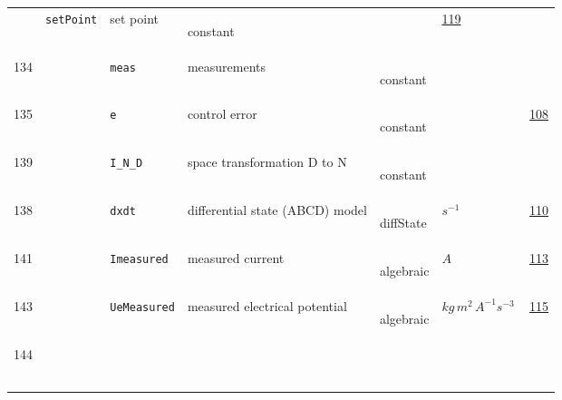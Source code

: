 \begin{longtable}{|p{1cm}|p{2.5cm}|p{4.5cm}|p{8cm}|p{3.0cm}|p{3cm}|p{1cm}|}
             & \verb|setPoint|
             & set point
             & \begin{lay}constant \end{lay}
             & $  $
             &                 \hyperlink{"e:119"}{ 119 }
                 \\
        134
             & \hypertarget{"v:134"}{ $ {} $}
             & \verb|meas|
             & measurements
             & \begin{lay}constant \end{lay}
             & $  $
             & \\
        135
             & \hypertarget{"v:135"}{ $ {} $}
             & \verb|e|
             & control error
             & \begin{lay}constant \end{lay}
             & $  $
             &                 \hyperlink{"e:108"}{ 108 }
                 \\
        139
             & \hypertarget{"v:139"}{ $ {} $}
             & \verb|I_N_D|
             & space transformation D to N
             & \begin{lay}constant \end{lay}
             & $  $
             & \\
        138
             & \hypertarget{"v:138"}{ $ {} $}
             & \verb|dxdt|
             & differential state (ABCD) model
             & \begin{lay}diffState \end{lay}
             & $ s^{-1} \, $
             &                 \hyperlink{"e:110"}{ 110 }
                 \\
        141
             & \hypertarget{"v:141"}{ $ {} $}
             & \verb|Imeasured|
             & measured current
             & \begin{lay}algebraic \end{lay}
             & $ A \, $
             &                 \hyperlink{"e:113"}{ 113 }
                 \\
        143
             & \hypertarget{"v:143"}{ $ {} $}
             & \verb|UeMeasured|
             & measured electrical potential
             & \begin{lay}algebraic \end{lay}
             & $ kg \,m^{2} \,A^{-1} s^{-3} \, $
             &                 \hyperlink{"e:115"}{ 115 }
                 \\
        144
             & \hypertarget{"v:144"}{ $ {} $}

\end{longtable}
